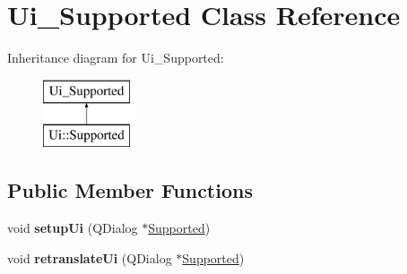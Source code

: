 \hypertarget{classUi__Supported}{\section{Ui\-\_\-\-Supported Class Reference}
\label{classUi__Supported}
}
Inheritance diagram for Ui\-\_\-\-Supported\-:\begin{figure}[H]
\begin{center}
\leavevmode
\includegraphics[height=2.000000cm]{classUi__Supported}
\end{center}
\end{figure}
\subsection*{Public Member Functions}
\begin{DoxyCompactItemize}
\item 
\hypertarget{classUi__Supported_a97569a1f269f7af6bd8c4a7664c79d43}{void {\bfseries setup\-Ui} (Q\-Dialog $\ast$\hyperlink{classSupported}{Supported})}\label{classUi__Supported_a97569a1f269f7af6bd8c4a7664c79d43}

\item 
\hypertarget{classUi__Supported_a5875ee5d52f72627137f1e489a5890a8}{void {\bfseries retranslate\-Ui} (Q\-Dialog $\ast$\hyperlink{classSupported}{Supported})}\label{classUi__Supported_a5875ee5d52f72627137f1e489a5890a8}

\end{DoxyCompactItemize}
